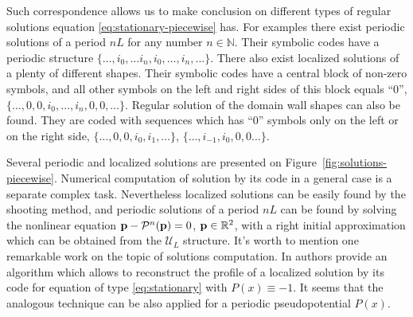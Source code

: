 Such correspondence allows us to make conclusion on different types of regular solutions equation \eqref{eq:stationary-piecewise} has.
For examples there exist periodic solutions of a period $nL$ for any number $n \in \mathbb{N}$.
Their symbolic codes have a periodic structure $\{ \dots, i_0, \dots i_n, i_0, \dots, i_n, \dots \}$.
There also exist localized solutions of a plenty of different shapes.
Their symbolic codes have a central block of non-zero symbols, and all other symbols on the left and right sides of this block equals ``$0$'', $\{ \dots, 0, 0, i_0, \dots, i_n, 0, 0, \dots \}$.
Regular solution of the domain wall shapes can also be found.
They are coded with sequences which has ``$0$'' symbols only on the left or on the right side, $\{ \dots, 0, 0, i_0, i_1, \dots \}$, $\{ \dots, i_{-1}, i_0, 0, 0 \dots \}$.

Several periodic and localized solutions are presented on Figure~\ref{fig:solutions-piecewise}.
Numerical computation of solution by its code in a general case is a separate complex task.
Nevertheless localized solutions can be easily found by the shooting method, and periodic solutions of a period $nL$ can be found by solving the nonlinear equation $\vb{p} - \mathcal{P}^n(\vb{p}) = 0$, $\vb{p} \in \mathbb{R}^2$, with a right initial approximation which can be obtained from the $\mathscr{U}_L$ structure.
It's worth to mention one remarkable work on the topic of solutions computation.
In \cite{AlfimovKizinZezyulin} authors provide an algorithm which allows to reconstruct the profile of a localized solution by its code for equation of type \eqref{eq:stationary} with $P(x) \equiv -1$.
It seems that the analogous technique can be also applied for a periodic pseudopotential $P(x)$.

